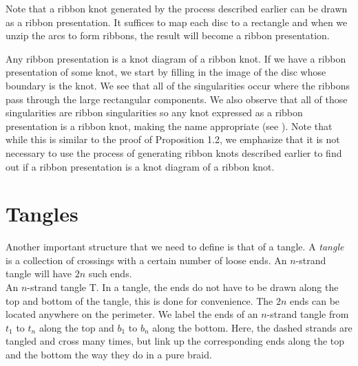 \documentclass{ws-jktr}
\begin{document}
Note that a ribbon knot generated by the process described earlier can be drawn
as a ribbon presentation.
It suffices to map each disc to a rectangle and when we unzip the arcs to form
ribbons, the result will become a ribbon presentation.

Any ribbon presentation is a knot diagram of a ribbon knot.
If we have a ribbon presentation of some knot, we start by filling in the image
of the disc whose boundary is the knot.
We see that all of the singularities occur where the ribbons pass through the
large rectangular components.
We also observe that all of those singularities are ribbon singularities so any
knot expressed as a ribbon presentation is a ribbon knot, making the name
appropriate (see \figSingularities).
Note that while this is similar to the proof of Proposition 1.2, we emphasize
that it is not necessary to use the process of generating ribbon knots described
earlier to find out if a ribbon presentation is a knot diagram of a ribbon knot.

\section{Tangles}

Another important structure that we need to define is that of a tangle.
A \textit{tangle} is a collection of crossings with a certain number of loose
ends.
An $n$-strand tangle will have $2n$ such ends.\\

{An $n$-strand tangle T.
In a tangle, the ends do not have to be drawn along the top and bottom of the
tangle, this is done for convenience.
The $2n$ ends can be located anywhere on the perimeter.
We label the ends of an $n$-strand tangle from $t_1$ to $t_n$ along the top and
$b_1$ to $b_n$ along the bottom.
Here, the dashed strands are tangled and cross many times, but link up the
corresponding ends along the top and the bottom the way they do in a pure
braid.}\\\\
\end{document}
